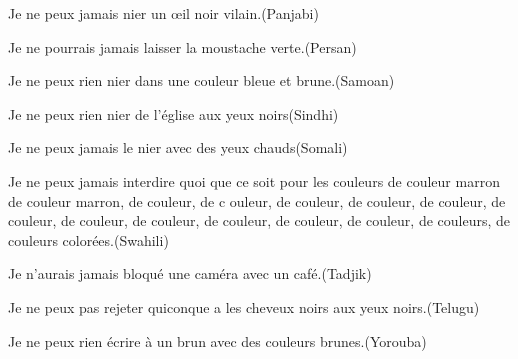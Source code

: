 \documentclass[a4paper, 11pt]{article}
\begin{document}
\begin{outputcbox}
Je ne peux jamais nier un œil noir vilain.\hfill(Panjabi)
\end{outputcbox}
\begin{outputcbox}
Je ne pourrais jamais laisser la moustache verte.\hfill(Persan)
\end{outputcbox}
\begin{outputcbox}
Je ne peux rien nier dans une couleur bleue et brune.\hfill(Samoan)
\end{outputcbox}
\begin{outputcbox}
Je ne peux rien nier de l'église aux yeux noirs\hfill(Sindhi)
\end{outputcbox}
\begin{outputcbox}
Je ne peux jamais le nier avec des yeux chauds\hfill(Somali)
\end{outputcbox}
\begin{outputcbox}
  Je ne peux jamais interdire quoi que ce soit pour les couleurs de
  couleur marron de couleur marron, de couleur, de c ouleur, de
  couleur, de couleur, de couleur, de couleur, de couleur, de couleur,
  de couleur, de couleur, de couleur, de couleurs, de couleurs
  colorées.\hfill(Swahili)
\end{outputcbox}
\begin{outputcbox}
Je n'aurais jamais bloqué une caméra avec un café.\hfill(Tadjik)
\end{outputcbox}
\begin{outputcbox}
Je ne peux pas rejeter quiconque a les cheveux noirs aux yeux noirs.\hfill(Telugu)
\end{outputcbox}
\begin{outputcbox}
Je ne peux rien écrire à un brun avec des couleurs brunes.\hfill(Yorouba)
\end{outputcbox}


\end{document}
